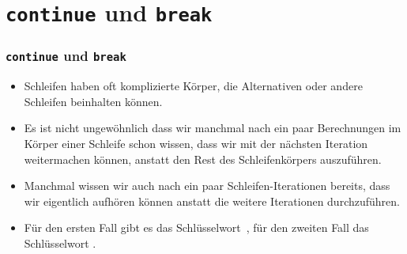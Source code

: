 \documentclass[aspectratio=169,mathserif,notheorems]{beamer}%
\begin{document}
\section{\texttt{continue} und \texttt{break}}%
%
\begin{frame}%
\frametitle{\texttt{continue} und \texttt{break}}%
\begin{itemize}%
\item Schleifen haben oft komplizierte Körper, die Alternativen oder andere Schleifen beinhalten können.%
%
\item<2-> Es ist nicht ungewöhnlich dass wir manchmal nach ein paar Berechnungen im Körper einer Schleife schon wissen, dass wir mit der nächsten Iteration weitermachen können, anstatt den Rest des Schleifenkörpers auszuführen.%
%
\item<3-> Manchmal wissen wir auch nach ein paar Schleifen-Iterationen bereits, dass wir eigentlich aufhören können anstatt die weitere Iterationen durchzuführen.%
%
\item<4-> Für den ersten Fall gibt es das Schlüsselwort~, für den zweiten Fall das Schlüsselwort .%
\end{itemize}%
\end{frame}%
%
\end{document}
